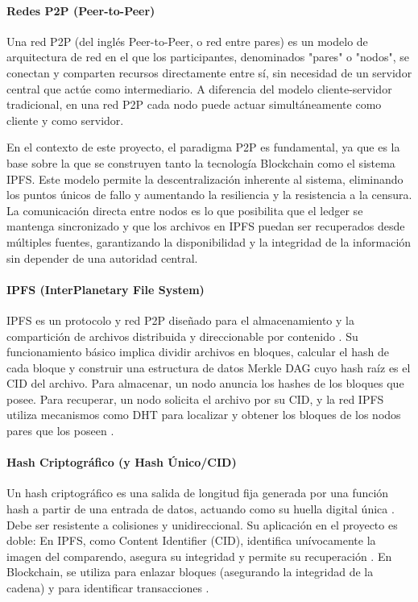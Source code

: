 \documentclass[
    letterpaper, 
    man,   
    spanish,
    12pt,
    donotrepeattitle,
    floatsintext,
    hidelinks %
]{apa7}
\begin{document}
\paragraph{Redes P2P (Peer-to-Peer)} 

 Una red P2P (del inglés Peer-to-Peer, o red entre pares) es un modelo de arquitectura de red en el que los participantes, denominados "pares" o "nodos", se conectan y comparten recursos directamente entre sí, sin necesidad de un servidor central que actúe como intermediario. A diferencia del modelo cliente-servidor tradicional, en una red P2P cada nodo puede actuar simultáneamente como cliente y como servidor. 

En el contexto de este proyecto, el paradigma P2P es fundamental, ya que es la base sobre la que se construyen tanto la tecnología Blockchain como el sistema IPFS. Este modelo permite la descentralización inherente al sistema, eliminando los puntos únicos de fallo y aumentando la resiliencia y la resistencia a la censura. La comunicación directa entre nodos es lo que posibilita que el ledger se mantenga sincronizado y que los archivos en IPFS puedan ser recuperados desde múltiples fuentes, garantizando la disponibilidad y la integridad de la información sin depender de una autoridad central. 
\paragraph{IPFS (InterPlanetary File System)} 

IPFS es un protocolo y red P2P diseñado para el almacenamiento y la compartición de archivos distribuida y direccionable por contenido \parencite{benet2014ipfs}. Su funcionamiento básico implica dividir archivos en bloques, calcular el hash de cada bloque y construir una estructura de datos Merkle DAG cuyo hash raíz es el CID del archivo. Para almacenar, un nodo anuncia los hashes de los bloques que posee. Para recuperar, un nodo solicita el archivo por su CID, y la red IPFS utiliza mecanismos como DHT \parencite{maymounkov2002kademlia} para localizar y obtener los bloques de los nodos pares que los poseen \parencite{benet2014ipfs}. 

\paragraph{Hash Criptográfico (y Hash Único/CID)} 

Un hash criptográfico es una salida de longitud fija generada por una función hash a partir de una entrada de datos, actuando como su huella digital única \parencite{menezes1996handbook}. Debe ser resistente a colisiones y unidireccional. Su aplicación en el proyecto es doble: En IPFS, como Content Identifier (CID), identifica unívocamente la imagen del comparendo, asegura su integridad y permite su recuperación \parencite{benet2014ipfs}. En Blockchain, se utiliza para enlazar bloques (asegurando la integridad de la cadena) y para identificar transacciones \parencite{nakamoto2008bitcoin}. 
\end{document}
